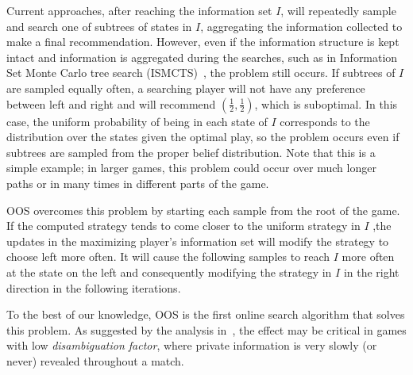 \documentclass{aamas2015}
\newcommand{\ttm}{\mathtt{m}}
\begin{document}
Current approaches, after reaching the information set $I$, will repeatedly sample and search one of subtrees of states in $I$, aggregating the information collected to make a final recommendation.
However, even if the information structure is kept intact and information is aggregated during the searches, such as in Information Set Monte Carlo tree search (ISMCTS)~\cite{Cowling12ISMCTS}, the problem still occurs. If subtrees of $I$ are sampled equally often, a searching player will not have any preference between left and right and will recommend $(\frac{1}{2},\frac{1}{2})$, which is suboptimal.
In this case, the uniform probability of being in each state of $I$ corresponds to the distribution over the states given the optimal play, so the problem occurs even if subtrees are sampled from the proper belief distribution. 
Note that this is a simple example; in larger games, this problem could occur over much longer paths or in many times in different parts of the game.

OOS overcomes this problem by starting each sample from the root of the game. If the computed strategy tends to come closer to the uniform strategy in $I$ ,the updates in the maximizing player's information set will modify the strategy to choose left more often. It will cause the following samples to reach $I$ more often at the state on the left and consequently modifying the strategy in $I$ in the right direction in the following iterations.

To the best of our knowledge, OOS is the first online search algorithm that solves this problem. As suggested by the analysis in~\cite{Long10Understanding}, the effect may be critical in games with low {\it disambiguation factor}, where private information is very slowly (or never) revealed throughout a match.
\end{document}
